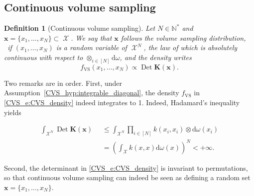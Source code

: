\documentclass[twoside,11pt]{book}
\newtheorem{definition}{Definition}
\numberwithin{theorem}{chapter}
\numberwithin{definition}{chapter}
\numberwithin{proposition}{chapter}
\numberwithin{corollary}{chapter}
\numberwithin{example}{chapter}
\numberwithin{lemma}{chapter}
\numberwithin{assumption}{chapter}
\numberwithin{equation}{chapter}
\numberwithin{figure}{chapter}
\DeclareMathOperator{\Det}{Det}
\DeclareMathOperator{\VS}{\mathrm{VS}}
\DeclareMathOperator{\X}{\mathcal{X}}
\DeclareMathOperator{\MuTen}{\otimes\mathrm{d}\omega(x_{i})}
\begin{document}
\subsection{Continuous volume sampling}
\begin{definition}[Continuous volume sampling]\label{CVS_def:VS}
Let $N \in \mathbb{N}^{*}$ and $\bm{x} = \{x_{1}, \dots, x_{N}\}\subset \X$. We say that $\bm{x}$ follows the volume sampling distribution,
 if $(x_{1}, \dots ,x_{N})$ is a random variable of $\X ^{N}$, the law of which is absolutely continuous with respect to $\otimes_{i \in [N]} \mathrm{d}\omega$, and the density writes
\begin{equation}
  \label{CVS_e:CVS_density}
f_{\VS}(x_{1}, \dots ,x_{N}) \propto \Det \bm{K}(\bm{x}).
\end{equation}
\end{definition}

Two remarks are in order. First, under Assumption~\ref{CVS_hyp:integrable_diagonal}, the density $f_{\VS}$ in  \eqref{CVS_e:CVS_density} indeed integrates to 1. Indeed, Hadamard's inequality yields

\begin{align}
\int_{\X ^{N}} \Det \bm{K}(\bm{x}) \MuTen & \leq \int_{\X ^{N}} \prod\limits_{i \in [N]} k(x_{i},x_{i}) \otimes\mathrm{d}\omega(x_{i}) \nonumber \\
& = \left(\int_{\X}k(x,x) \mathrm{d}\omega(x) \right)^{N}  < +\infty. \nonumber
\end{align}

Second, the determinant in \eqref{CVS_e:CVS_density} is invariant to permutations, so that continuous volume sampling can indeed be seen as defining a random set $\bm{x} = \{x_1,\dots,x_N\}$.
\end{document}
